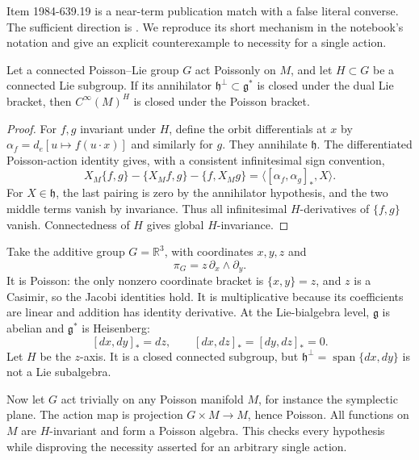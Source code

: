 Item 1984-639.19 is a near-term publication match with a false literal converse. The sufficient direction is \citet[Theorem 6]{semenov1985dressing}. We reproduce its short mechanism in the notebook's notation and give an explicit counterexample to necessity for a single action.

\begin{proposition}\ours
Let a connected Poisson--Lie group \(G\) act Poissonly on \(M\), and let \(H\subset G\) be a connected Lie subgroup. If its annihilator
\(\mathfrak h^\perp\subset\mathfrak g^*\) is closed under the dual Lie bracket, then \(C^\infty(M)^H\) is closed under the Poisson bracket.
\end{proposition}
\begin{proof}
For \(f,g\) invariant under \(H\), define the orbit differentials at \(x\) by
\(\alpha_f=d_e[u\mapsto f(u\cdot x)]\) and similarly for \(g\).
They annihilate \(\mathfrak h\). The differentiated Poisson-action identity gives, with a consistent infinitesimal sign convention,
\[
 X_M\{f,g\}-\{X_Mf,g\}-\{f,X_Mg\}
       =\langle[\alpha_f,\alpha_g]_*,X\rangle .
\]
For \(X\in\mathfrak h\), the last pairing is zero by the annihilator hypothesis, and the two middle terms vanish by invariance. Thus all infinitesimal \(H\)-derivatives of \(\{f,g\}\) vanish. Connectedness of \(H\) gives global \(H\)-invariance.
\end{proof}

\begin{example}\ours
Take the additive group \(G=\mathbb R^3\), with coordinates \(x,y,z\) and
\[
 \pi_G=z\,\partial_x\wedge\partial_y .
\]
It is Poisson: the only nonzero coordinate bracket is \(\{x,y\}=z\), and \(z\) is a Casimir, so the Jacobi identities hold. It is multiplicative because its coefficients are linear and addition has identity derivative. At the Lie-bialgebra level, \(\mathfrak g\) is abelian and \(\mathfrak g^*\) is Heisenberg:
\[
 [dx,dy]_*=dz,\qquad [dx,dz]_*=[dy,dz]_*=0.
\]
Let \(H\) be the \(z\)-axis. It is a closed connected subgroup, but
\(\mathfrak h^\perp=\operatorname{span}\{dx,dy\}\) is not a Lie subalgebra.

Now let \(G\) act trivially on any Poisson manifold \(M\), for instance the symplectic plane. The action map is projection \(G\times M\to M\), hence Poisson. All functions on \(M\) are \(H\)-invariant and form a Poisson algebra. This checks every hypothesis while disproving the necessity asserted for an arbitrary single action.
\end{example}

